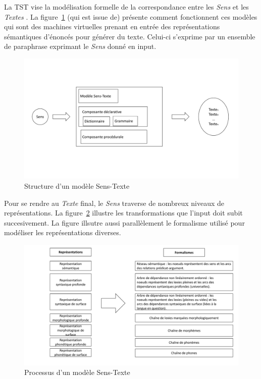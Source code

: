 La \ac{TST} vise la modélisation formelle de la correspondance entre les \emph{Sens} et les \emph{Textes} \citep{PolgueretheorieSensTexte1998, MelcukVerslinguistiqueSensTexte1997, DBLP:conf/coling/JolkovskyM67}. La figure~\ref{fig:modeletst} (qui est issue de\cite{PolgueretheorieSensTexte1998}) présente comment fonctionnent ces modèles qui sont des machines virtuelles prenant en entrée des représentations sémantiques d'énoncés pour générer du texte. Celui-ci s'exprime par un ensemble de paraphrase exprimant le \emph{Sens} donné en input.

\begin{figure}[htb]
	\centering
	\includegraphics[width=1\textwidth, trim = {0cm 4cm 0cm 4cm},clip]{ch3/figs/polguere1.pdf}
	\caption{Structure d'un modèle Sens-Texte \citep{PolgueretheorieSensTexte1998}}
	\label{fig:modeletst}
\end{figure}

Pour se rendre au \emph{Texte} final, le \emph{Sens} traverse de nombreux niveaux de représentations. La figure~\ref{fig:processustst} illustre les transformations que l'input doit subit succesivement. La figure illsutre aussi parallèlement le formalisme utilisé pour modéliser les représentations diverses.

\begin{figure}[htb]
	\centering
	\includegraphics[width=1\textwidth, trim = {0cm 0cm 0cm 0cm},clip]{ch3/figs/polguere2.pdf}
	\caption{Processus d'un modèle Sens-Texte \citep{PolgueretheorieSensTexte1998}}
	\label{fig:processustst}
\end{figure}

